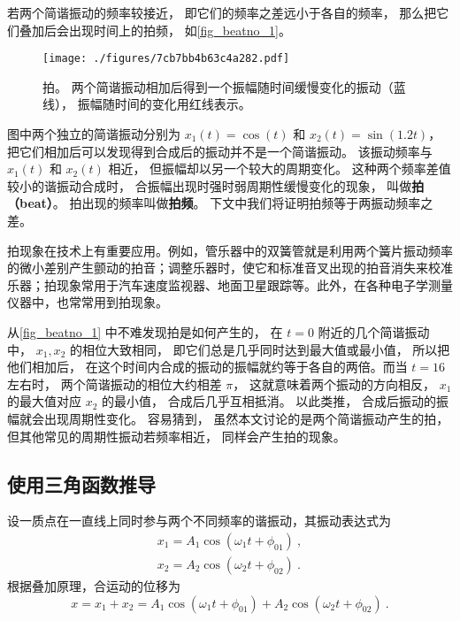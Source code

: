 

若两个简谐振动的频率较接近， 即它们的频率之差远小于各自的频率， 那么把它们叠加后会出现时间上的拍频， 如\autoref{fig_beatno_1}。
\begin{figure}[ht]
\centering
\texttt{[image: ./figures/7cb7bb4b63c4a282.pdf]}
\caption{拍。 两个简谐振动相加后得到一个振幅随时间缓慢变化的振动（蓝线）， 振幅随时间的变化用红线表示。} \label{fig_beatno_1}
\end{figure}
图中两个独立的简谐振动分别为 $x_1(t) = \cos(t)$ 和 $x_2(t) = \sin(1.2t)$， 把它们相加后可以发现得到合成后的振动并不是一个简谐振动。 该振动频率与 $x_1(t)$ 和 $x_2(t)$ 相近， 但振幅却以另一个较大的周期变化。 这种两个频率差值较小的谐振动合成时， 合振幅出现时强时弱周期性缓慢变化的现象， 叫做\textbf{拍（beat）}。 拍出现的频率叫做\textbf{拍频}。 下文中我们将证明拍频等于两振动频率之差。

拍现象在技术上有重要应用。例如，管乐器中的双簧管就是利用两个簧片振动频率的微小差别产生颤动的拍音；调整乐器时，使它和标准音叉出现的拍音消失来校准乐器；拍现象常用于汽车速度监视器、地面卫星跟踪等。此外，在各种电子学测量仪器中，也常常用到拍现象。

从\autoref{fig_beatno_1} 中不难发现拍是如何产生的， 在 $t = 0$ 附近的几个简谐振动中， $x_1, x_2$ 的相位大致相同， 即它们总是几乎同时达到最大值或最小值， 所以把他们相加后， 在这个时间内合成的振动的振幅就约等于各自的两倍。而当 $t = 16$ 左右时， 两个简谐振动的相位大约相差 $\pi$， 这就意味着两个振动的方向相反， $x_1$ 的最大值对应 $x_2$ 的最小值， 合成后几乎互相抵消。 以此类推， 合成后振动的振幅就会出现周期性变化。
容易猜到， 虽然本文讨论的是两个简谐振动产生的拍， 但其他常见的周期性振动若频率相近， 同样会产生拍的现象。

\subsection{使用三角函数推导}
设一质点在一直线上同时参与两个不同频率的谐振动，其振动表达式为
\begin{equation}
\begin{array}{l}x_{1}=A_{1} \cos \left(\omega_{1} t+\phi_{01}\right) ~,\\ x_{2}=A_{2} \cos \left(\omega_{2} t+\phi_{02}\right)~.\end{array}
\end{equation}
根据叠加原理，合运动的位移为
\begin{equation}
x=x_{1}+x_{2}=A_{1} \cos \left(\omega_{1} t+\phi_{01}\right)+A_{2} \cos \left(\omega_{2} t+\phi_{02}\right)~.
\end{equation}

